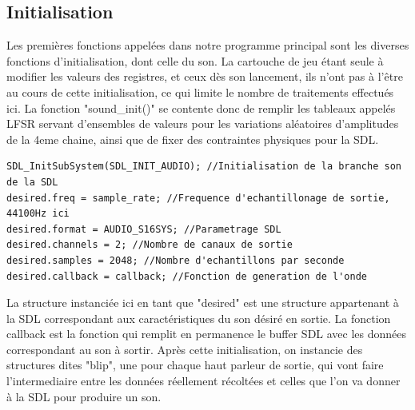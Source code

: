 \documentclass{report}
\begin{document}
\subsection{Initialisation}
Les premières fonctions appelées dans notre programme principal sont les diverses fonctions d'initialisation, dont celle du son.
La cartouche de jeu étant seule à modifier les valeurs des registres, et ceux dès son lancement, ils n'ont pas à l'être au cours de cette initialisation, ce qui limite le nombre de traitements effectués ici.
La fonction "sound\_init()" se contente donc de remplir les tableaux appelés LFSR servant d'ensembles de valeurs pour les variations aléatoires d'amplitudes de la 4eme chaine, ainsi que de fixer des contraintes physiques pour la SDL.
\begin{lstlisting}
SDL_InitSubSystem(SDL_INIT_AUDIO); //Initialisation de la branche son de la SDL
desired.freq = sample_rate; //Frequence d'echantillonage de sortie, 44100Hz ici
desired.format = AUDIO_S16SYS; //Parametrage SDL
desired.channels = 2; //Nombre de canaux de sortie
desired.samples = 2048; //Nombre d'echantillons par seconde
desired.callback = callback; //Fonction de generation de l'onde
\end{lstlisting}
La structure instanciée ici en tant que "desired" est une structure appartenant à la SDL correspondant aux caractéristiques du son désiré en sortie.
La fonction callback est la fonction qui remplit en permanence le buffer SDL avec les données correspondant au son à sortir.
Après cette initialisation, on instancie des structures dites "blip", une pour chaque haut parleur de sortie, qui vont faire l'intermediaire entre les données réellement récoltées et celles que l'on va donner à la SDL pour produire un son.
\end{document}
